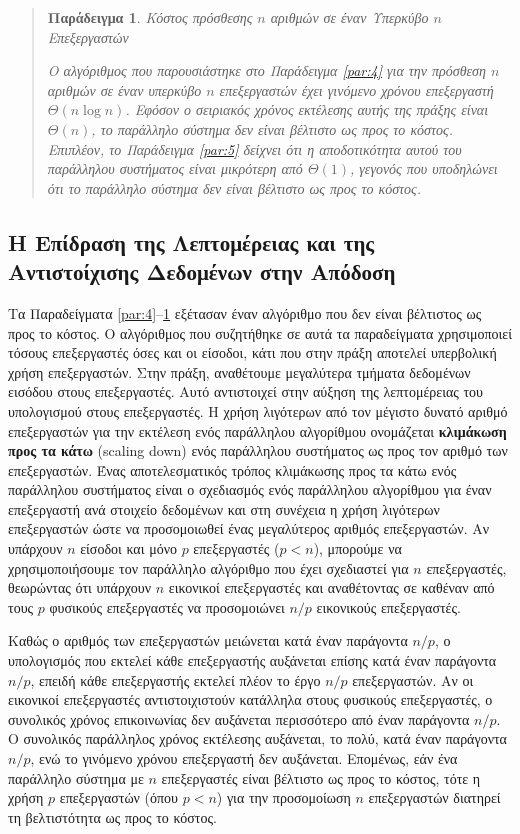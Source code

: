 \documentclass[12pt,a4paper]{article}
\newtheorem{paradeigma}{Παράδειγμα}
\begin{document}
\begin{quote}
\begin{paradeigma} \label{par:6} Κόστος πρόσθεσης $n$ αριθμών σε έναν Υπερκύβο $n$ Επεξεργαστών

Ο αλγόριθμος που παρουσιάστηκε στο Παράδειγμα \ref{par:4} για την πρόσθεση 
$n$ αριθμών σε έναν υπερκύβο $n$ επεξεργαστών έχει γινόμενο χρόνου 
επεξεργαστή $\Theta(n \log n)$. Εφόσον ο σειριακός χρόνος εκτέλεσης αυτής 
της πράξης είναι $\Theta(n)$, το παράλληλο σύστημα δεν είναι βέλτιστο ως 
προς το κόστος. Επιπλέον, το Παράδειγμα \ref{par:5} δείχνει ότι η 
αποδοτικότητα αυτού του παράλληλου συστήματος είναι μικρότερη από $\Theta(1)$, 
γεγονός που υποδηλώνει ότι το παράλληλο σύστημα δεν είναι βέλτιστο ως 
προς το κόστος.
\end{paradeigma}
\end{quote}

\subsection{Η Επίδραση της Λεπτομέρειας και της Αντιστοίχισης Δεδομένων στην Απόδοση}

Τα Παραδείγματα \ref{par:4}--\ref{par:6} εξέτασαν έναν αλγόριθμο που δεν 
είναι βέλτιστος ως προς το κόστος. Ο αλγόριθμος που συζητήθηκε σε αυτά τα 
παραδείγματα χρησιμοποιεί τόσους επεξεργαστές όσες και οι είσοδοι, κάτι 
που στην πράξη αποτελεί υπερβολική χρήση επεξεργαστών. Στην πράξη, αναθέτουμε 
μεγαλύτερα τμήματα δεδομένων εισόδου στους επεξεργαστές. Αυτό αντιστοιχεί 
στην αύξηση της λεπτομέρειας του υπολογισμού στους επεξεργαστές. Η χρήση 
λιγότερων από τον μέγιστο δυνατό αριθμό επεξεργαστών για την εκτέλεση ενός 
παράλληλου αλγορίθμου ονομάζεται \textbf{κλιμάκωση προς τα κάτω} 
(\foreignlanguage{english}{scaling down}) ενός παράλληλου συστήματος ως 
προς τον αριθμό των επεξεργαστών. Ένας αποτελεσματικός τρόπος κλιμάκωσης 
προς τα κάτω ενός παράλληλου συστήματος είναι ο σχεδιασμός ενός παράλληλου 
αλγορίθμου για έναν επεξεργαστή ανά στοιχείο δεδομένων και στη συνέχεια η 
χρήση λιγότερων επεξεργαστών ώστε να προσομοιωθεί ένας μεγαλύτερος αριθμός 
επεξεργαστών. Αν υπάρχουν $n$ είσοδοι και μόνο $p$ επεξεργαστές ($p < n$), 
μπορούμε να χρησιμοποιήσουμε τον παράλληλο αλγόριθμο που έχει σχεδιαστεί 
για $n$ επεξεργαστές, θεωρώντας ότι υπάρχουν $n$ εικονικοί επεξεργαστές 
και αναθέτοντας σε καθέναν από τους $p$ φυσικούς επεξεργαστές να 
προσομοιώνει $n/p$ εικονικούς επεξεργαστές.

Καθώς ο αριθμός των επεξεργαστών μειώνεται κατά έναν παράγοντα $n/p$, ο 
υπολογισμός που εκτελεί κάθε επεξεργαστής αυξάνεται επίσης κατά έναν 
παράγοντα $n/p$, επειδή κάθε επεξεργαστής εκτελεί πλέον το έργο $n/p$ 
επεξεργαστών. Αν οι εικονικοί επεξεργαστές αντιστοιχιστούν κατάλληλα στους 
φυσικούς επεξεργαστές, ο συνολικός χρόνος επικοινωνίας δεν αυξάνεται 
περισσότερο από έναν παράγοντα $n/p$. Ο συνολικός παράλληλος χρόνος 
εκτέλεσης αυξάνεται, το πολύ, κατά έναν παράγοντα $n/p$, ενώ το γινόμενο 
χρόνου επεξεργαστή δεν αυξάνεται. Επομένως, εάν ένα παράλληλο σύστημα με 
$n$ επεξεργαστές είναι βέλτιστο ως προς το κόστος, τότε η χρήση $p$ 
επεξεργαστών (όπου $p < n$) για την προσομοίωση $n$ επεξεργαστών διατηρεί 
τη βελτιστότητα ως προς το κόστος.
\end{document}
